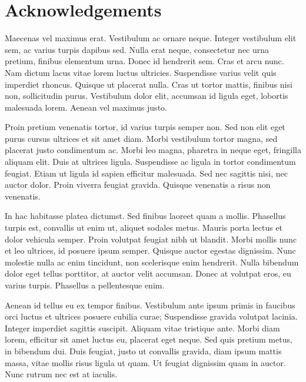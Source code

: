 \section*{Acknowledgements}

Maecenas vel maximus erat. Vestibulum ac ornare neque. Integer vestibulum elit sem, ac varius turpis dapibus sed. Nulla erat neque, consectetur nec urna pretium, finibus elementum urna. Donec id hendrerit sem. Cras et arcu nunc. Nam dictum lacus vitae lorem luctus ultricies. Suspendisse varius velit quis imperdiet rhoncus. Quisque ut placerat nulla. Cras ut tortor mattis, finibus nisi non, sollicitudin purus. Vestibulum dolor elit, accumsan id ligula eget, lobortis malesuada lorem. Aenean vel maximus justo.

Proin pretium venenatis tortor, id varius turpis semper non. Sed non elit eget purus cursus ultrices et sit amet diam. Morbi vestibulum tortor magna, sed placerat justo condimentum ac. Morbi leo magna, pharetra in neque eget, fringilla aliquam elit. Duis at ultrices ligula. Suspendisse ac ligula in tortor condimentum feugiat. Etiam ut ligula id sapien efficitur malesuada. Sed nec sagittis nisi, nec auctor dolor. Proin viverra feugiat gravida. Quisque venenatis a risus non venenatis.

In hac habitasse platea dictumst. Sed finibus laoreet quam a mollis. Phasellus turpis est, convallis ut enim ut, aliquet sodales metus. Mauris porta lectus et dolor vehicula semper. Proin volutpat feugiat nibh ut blandit. Morbi mollis nunc et leo ultrices, id posuere ipsum semper. Quisque auctor egestas dignissim. Nunc molestie nulla ac enim tincidunt, non scelerisque enim hendrerit. Nulla bibendum dolor eget tellus porttitor, at auctor velit accumsan. Donec at volutpat eros, eu varius turpis. Phasellus a pellentesque enim.

Aenean id tellus eu ex tempor finibus. Vestibulum ante ipsum primis in faucibus orci luctus et ultrices posuere cubilia curae; Suspendisse gravida volutpat lacinia. Integer imperdiet sagittis suscipit. Aliquam vitae tristique ante. Morbi diam lorem, efficitur sit amet luctus eu, placerat eget neque. Sed quis pretium metus, in bibendum dui. Duis feugiat, justo ut convallis gravida, diam ipsum mattis massa, vitae mollis risus ligula ut quam. Ut feugiat dignissim quam in auctor. Nunc rutrum nec est at iaculis.
